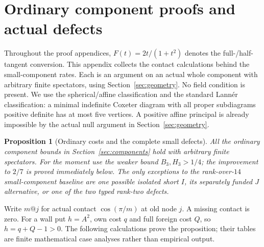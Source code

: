 \documentclass[11pt]{article}
\newtheorem{proposition}[theorem]{Proposition}
\theoremstyle{definition}
\theoremstyle{remark}
\begin{document}
\appendix

\section{Ordinary component proofs and actual defects}
\label{app:ordinary}
Throughout the proof appendices, \(F(t)=2t/(1+t^2)\) denotes
the full-/half-tangent conversion.
This appendix collects the contact calculations behind the small-component
rates. Each is an argument on an actual whole component with arbitrary
finite spectators, using Section~\ref{sec:geometry}. No field condition
is present. We use the spherical/affine classification and the standard
Lann\'er classification: a minimal indefinite Coxeter diagram with all
proper subdiagrams positive definite has at most five vertices.
A positive affine principal is already impossible by the actual null
argument in Section~\ref{sec:geometry}.

\begin{proposition}[Ordinary costs and the complete small defects]
\label{app:prop:ordinary}
All the ordinary component bounds in Section~\ref{sec:components}
hold with arbitrary finite spectators. For the moment use the weaker
bound \(B_3,H_3>1/4\); the improvement to \(2/7\) is proved immediately
below. The only exceptions to the rank-over-\(14\) small-component
baseline are one possible isolated short \(I\), its separately funded
\(J\) alternative, or one of the two typed rank-two defects.
\end{proposition}
Write \(m@j\) for actual contact \(\cos(\pi/m)\) at old node \(j\).
A missing contact is zero. For a wall put \(h=A^2\), own cost
\(q\) and full foreign cost \(Q\), so \(h=q+Q-1>0\).
The following calculations prove the proposition; their tables are
finite mathematical case analyses rather than empirical output.
\end{document}
